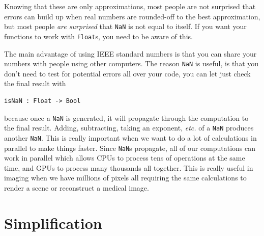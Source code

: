 \documentclass[12pt]{amsbook}
\begin{document}
Knowing that these are only approximations,
most people are not surprised that errors can build up when
real numbers are rounded-off to the best approximation,
but most people \emph{are surprised} that \verb|NaN| is not
equal to itself.
If you want your functions to work with \verb|Float|s,
you need to be aware of this.

The main advantage of using IEEE standard numbers is that you can
share your numbers with people using other computers.
The reason \verb|NaN| is useful,
is that you don't need to test for potential errors all over your code,
you can let just check the final result with 
\begin{verbatim}
isNaN : Float -> Bool
\end{verbatim}
because once a \verb|NaN| is generated, it will propagate through
the computation to the final result.
Adding, subtracting, taking an exponent, \emph{etc.} of a \verb|NaN|
produces another \verb|NaN|.
This is really important when we want to do a lot of calculations
in parallel to make things faster.
Since \verb|NaN|s propagate, all of our computations can work in parallel
which allows CPUs to process tens of operations at the same time, 
and GPUs to process many thousands all together.  
This is really useful in imaging when we have millions of pixels
all requiring the same calculations to render a scene or reconstruct a medical image.

\section{Simplification}
\end{document}
